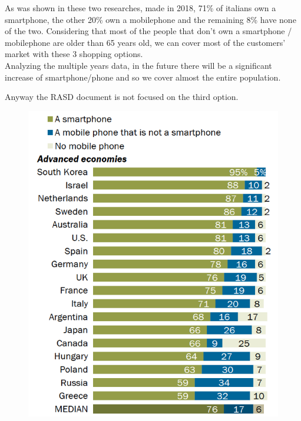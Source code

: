 As was shown in these two researches, made in 2018, 71\% of italians own a smartphone, the other 20\% own a mobilephone and the remaining 8\% have none of the two.
Considering that most of the people that don't own a smartphone / mobilephone are older than 65 years old, we can cover most of the customers' market with these 3 shopping options.\\
Analyzing the multiple years data, in the future there will be a significant increase of smartphone/phone and so we cover almost the entire population.\par 
Anyway the RASD document is not focused on the third option.\par


\begin{figure}[H]
  \centering
  {\includegraphics[scale=0.50]{images/statistics_smartphone.png}}
  \hfill

\end{figure}

